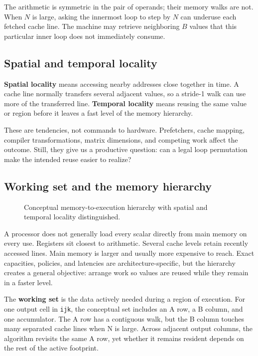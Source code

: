 \documentclass[
  10pt,
]{article}
\begin{document}
The arithmetic is symmetric in the pair of operands; their memory walks
are not. When \(N\) is large, asking the innermost loop to step by \(N\)
can underuse each fetched cache line. The machine may retrieve
neighboring \(B\) values that this particular inner loop does not
immediately consume.

\subsection{Spatial and temporal
locality}\label{spatial-and-temporal-locality}

\textbf{Spatial locality} means accessing nearby addresses close
together in time. A cache line normally transfers several adjacent
values, so a stride-1 walk can use more of the transferred line.
\textbf{Temporal locality} means reusing the same value or region before
it leaves a fast level of the memory hierarchy.

These are tendencies, not commands to hardware. Prefetchers, cache
mapping, compiler transformations, matrix dimensions, and competing work
affect the outcome. Still, they give us a productive question: can a
legal loop permutation make the intended reuse easier to realize?

\subsection{Working set and the memory
hierarchy}\label{working-set-and-the-memory-hierarchy}

\begin{figure}[H]\centering\resizebox{\linewidth}{!}{}\caption{Conceptual memory-to-execution hierarchy with spatial and temporal locality distinguished.}\end{figure}

A processor does not generally load every scalar directly from main
memory on every use. Registers sit closest to arithmetic. Several cache
levels retain recently accessed lines. Main memory is larger and usually
more expensive to reach. Exact capacities, policies, and latencies are
architecture-specific, but the hierarchy creates a general objective:
arrange work so values are reused while they remain in a faster level.

The \textbf{working set} is the data actively needed during a region of
execution. For one output cell in \texttt{ijk}, the conceptual set
includes an A row, a B column, and one accumulator. The A row has a
contiguous walk, but the B column touches many separated cache lines
when N is large. Across adjacent output columns, the algorithm revisits
the same A row, yet whether it remains resident depends on the rest of
the active footprint.
\end{document}
